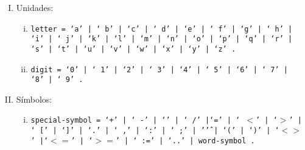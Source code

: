 \begin{enumerate}[I.]

\item Unidades:

\begin{enumerate}[i.]

\item \texttt{letter = \textquoteleft a\textquoteright\ | \textquoteleft
b\textquoteright\  | \textquoteleft c\textquoteright\  | \textquoteleft
d\textquoteright\  | \textquoteleft e\textquoteright\  | \textquoteleft
f\textquoteright\  | \textquoteleft g\textquoteright\  | \textquoteleft
h\textquoteright\  | \textquoteleft i\textquoteright\ | \textquoteleft
j\textquoteright\ 
          | \textquoteleft k\textquoteright\ | \textquoteleft l\textquoteright\
| \textquoteleft m\textquoteright\ | \textquoteleft n\textquoteright\ |
\textquoteleft o' | \textquoteleft p' | \textquoteleft q\textquoteright\ |
\textquoteleft r\textquoteright\ | \textquoteleft s\textquoteright\ |
\textquoteleft t\textquoteright
          | \textquoteleft u\textquoteright\ | \textquoteleft v\textquoteright\
| \textquoteleft w\textquoteright\ | \textquoteleft x\textquoteright\ |
\textquoteleft y\textquoteright\ | \textquoteleft z\textquoteright\ .}

\item \texttt{digit = \textquoteleft 0\textquoteright\ | \textquoteleft
1\textquoteright\ | \textquoteleft 2\textquoteright\ | \textquoteleft
3\textquoteright\ | \textquoteleft 4\textquoteright\ | \textquoteleft
5\textquoteright\ | \textquoteleft 6\textquoteright\ | \textquoteleft
7\textquoteright\ | \textquoteleft 8\textquoteright\ | \textquoteleft
9\textquoteright\ .}

\end{enumerate}

\item Símbolos:

\begin{enumerate}[i.]

\item \texttt{special-symbol = \textquoteleft +\textquoteright\ | \textquoteleft
-\textquoteright\ | \textquoteleft *\textquoteright\ | \textquoteleft
/\textquoteright\ |\textquoteleft =\textquoteright\ | \textquoteleft
$<$\textquoteright\ | \textquoteleft $>$\textquoteright\ | \textquoteleft
[\textquoteright\ | \textquoteleft ]\textquoteright
                  | \textquoteleft .\textquoteright\ |  \textquoteleft
,\textquoteright\ | \textquoteleft :\textquoteright\ | \textquoteleft
;\textquoteright\ | '\^\textquoteright\ | \textquoteleft (\textquoteright\ |
\textquoteleft )\textquoteright
                  | \textquoteleft $< >$\textquoteright\ |\textquoteleft $<
=$\textquoteright\ | \textquoteleft $> =$\textquoteright\ | \textquoteleft
:=\textquoteright\ | \textquoteleft ..\textquoteright\ | word-symbol .}
               


\end{enumerate}
\end{enumerate}
